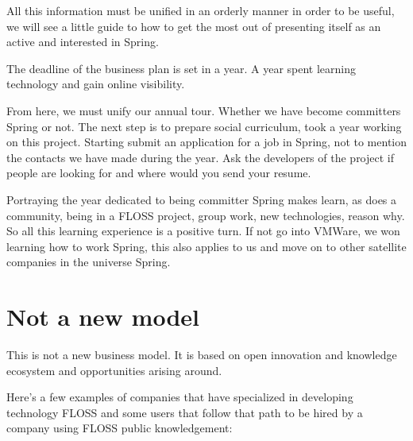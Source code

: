 \documentclass[11pt]{scrartcl}
\begin{document}
\par All this information must be unified in an orderly manner in order to be useful, we will see a little guide to how to get the most out of presenting itself as an active and interested in Spring.

\par The deadline of the business plan is set in a year. A year spent learning technology and gain online visibility.

\par From here, we must unify our annual tour. Whether we have become committers Spring or not. The next step is to prepare social curriculum, took a year working on this project. Starting submit an application for a job in Spring, not to mention the contacts we have made during the year. Ask the developers of the project if people are looking for and where would you send your resume.

\par Portraying the year dedicated to being committer Spring makes learn, as does a community, being in a FLOSS project, group work, new technologies, reason why. So all this learning experience is a positive turn. If not go into VMWare, we won learning how to work Spring, this also applies to us and move on to other satellite companies in the universe Spring.

\section{Not a new model}

\par This is not a new business model. It is based on open innovation and knowledge ecosystem and opportunities arising around.

\par Here's a few examples of companies that have specialized in developing technology FLOSS and some users that follow that path to be hired by a company using FLOSS public knowledgement:
\end{document}
